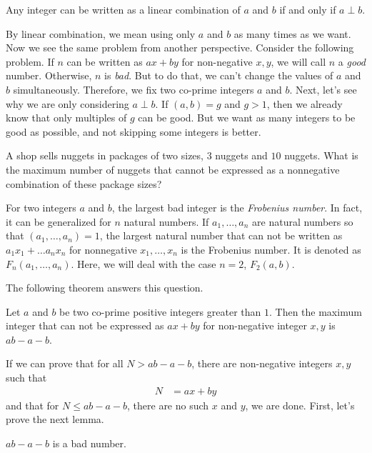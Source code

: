 \documentclass{subfile}
\begin{document}
	\begin{theorem}
		Any integer can be written as a linear combination of $a$ and $b$ if and only if $a\perp b$.
	\end{theorem}
By linear combination, we mean using only $a$ and $b$ as many times as we want. Now we see the same problem from another perspective. Consider the following problem. If $n$ can be written as $ax+by$ for non-negative $x,y$, we will call $n$ a \textit{good} number. Otherwise, $n$ is \textit{bad}. But to do that, we can't change the values of $a$ and $b$ simultaneously. Therefore, we fix two co-prime integers $a$ and $b$. Next, let's see why we are only considering $a\perp b$. If $(a,b)=g$ and $g>1$, then we already know that only multiples of $g$ can be good. But we want as many integers to be good as possible, and not skipping some integers is better.
	\begin{problem}
		A shop sells nuggets in packages of two sizes, $3$ nuggets and $10$ nuggets. What is the maximum number of nuggets that cannot be expressed as a nonnegative combination of these package sizes?
	\end{problem}

	\begin{definition}
		For two integers $a$ and $b$, the largest bad integer is the \textit{Frobenius number}. In fact, it can be generalized for $n$ natural numbers. If $a_1,\ldots,a_n$ are natural numbers so that $(a_1,\ldots,a_n)=1$, the largest natural number that can not be written as $a_1x_1+\ldots a_nx_n$ for nonnegative $x_1,\ldots,x_n$ is the Frobenius number. It is denoted as $F_n(a_1,\ldots,a_n)$. Here, we will deal with the case $n=2$, $F_2(a,b)$.
	\end{definition}
The following theorem answers this question.
	\begin{theorem}
		Let $a$ and $b$ be two co-prime positive integers greater than $1$. Then the maximum integer that can not be expressed as $ax+by$ for non-negative integer $x,y$ is $ab-a-b$.
	\end{theorem}
If we can prove that for all $N>ab-a-b$, there are non-negative integers $x,y$ such that
	\begin{align*}
		N & = ax+by
	\end{align*}
and that for $N\leq ab-a-b$, there are no such $x$ and $y$, we are done. First, let's prove the next lemma.
	\begin{lemma}
		$ab-a-b$ is a bad number.
	\end{lemma}
\end{document}
